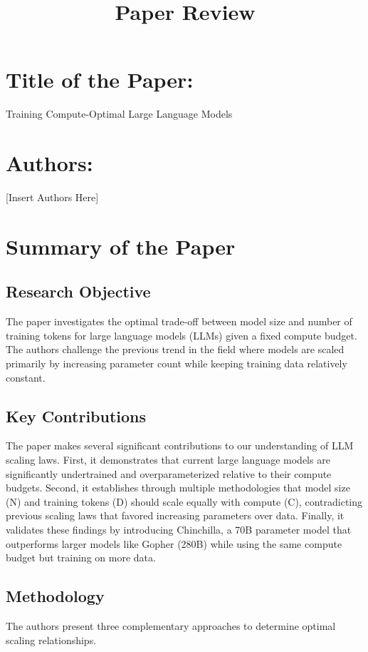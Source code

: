 \documentclass{article}
\title{\textbf{Paper Review}}
\author{}
\date{}
\begin{document}
\maketitle

\section*{Title of the Paper:}
Training Compute-Optimal Large Language Models

\section*{Authors:}
[Insert Authors Here]
\section{Summary of the Paper}

\subsection{Research Objective}
The paper investigates the optimal trade-off between model size and number of training tokens for large language models (LLMs) given a fixed compute budget. The authors challenge the previous trend in the field where models are scaled primarily by increasing parameter count while keeping training data relatively constant.

\subsection{Key Contributions}
The paper makes several significant contributions to our understanding of LLM scaling laws. First, it demonstrates that current large language models are significantly undertrained and overparameterized relative to their compute budgets. Second, it establishes through multiple methodologies that model size (N) and training tokens (D) should scale equally with compute (C), contradicting previous scaling laws that favored increasing parameters over data. Finally, it validates these findings by introducing Chinchilla, a 70B parameter model that outperforms larger models like Gopher (280B) while using the same compute budget but training on more data.

\subsection{Methodology}
The authors present three complementary approaches to determine optimal scaling relationships. 
\end{document}

